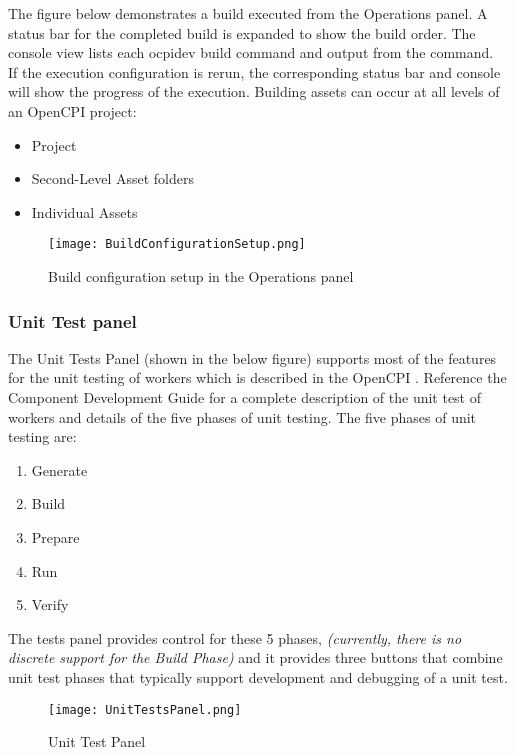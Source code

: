 The figure below demonstrates a build executed from the Operations panel. A status bar for the completed build is expanded to show the build order. The console view lists each ocpidev build command and output from the command.\\

If the execution configuration is rerun, the corresponding status bar and console will show the progress of the execution. Building assets can occur at all levels of an OpenCPI project:
\begin{itemize}
\item Project
\item Second-Level Asset folders
\item Individual Assets
\end{itemize}

\begin{figure}[h!]
    \centering
    \caption{Build configuration setup in the Operations panel}

    \texttt{[image: BuildConfigurationSetup.png]}
     \label{fig:Operations panel}
\end{figure}
\subsubsection{Unit Test panel}
The Unit Tests Panel (shown in the below figure) supports most of the features for the unit testing of workers which is described in the OpenCPI .
Reference the Component Development Guide for a complete description of the unit test of workers and details of the five phases of unit testing. The five phases of unit testing are:
\begin{enumerate}
\item Generate
\item Build
\item Prepare
\item Run
\item Verify
\end{enumerate}
The tests panel provides control for these 5 phases, \emph{(currently, there is no discrete support for the Build Phase)} and it provides three buttons that combine unit test phases that typically support development and debugging of a unit test.
\begin{figure}[h!]
    \centering
    \caption{Unit Test Panel}
    \texttt{[image: UnitTestsPanel.png]}
      \label{fig:Unit Test panel}
\end{figure}

